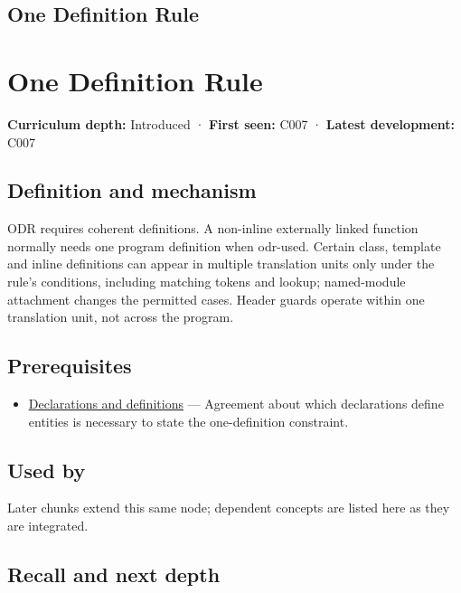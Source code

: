 \hypertarget{appendix-49d27bc9d9a5}{}
\section*{One Definition Rule}
\chapter{One Definition Rule}\label{appendix-49d27bc9d9a5-one-definition-rule}

\textbf{Curriculum depth:} Introduced · \textbf{First seen:} C007 · \textbf{Latest development:} C007

\section{Definition and mechanism}\label{appendix-49d27bc9d9a5-definition-and-mechanism}

ODR requires coherent definitions. A non-inline externally linked function normally needs one program definition when odr-used. Certain class, template and inline definitions can appear in multiple translation units only under the rule's conditions, including matching tokens and lookup; named-module attachment changes the permitted cases. Header guards operate within one translation unit, not across the program.

\section{Prerequisites}\label{appendix-49d27bc9d9a5-prerequisites}

\begin{itemize}
\tightlist
\item
  \hyperref[appendix-2e4d494c2d94]{Declarations and definitions} --- Agreement about which declarations define entities is necessary to state the one-definition constraint.
\end{itemize}

\section{Used by}\label{appendix-49d27bc9d9a5-used-by}

Later chunks extend this same node; dependent concepts are listed here as they are integrated.

\section{Recall and next depth}\label{appendix-49d27bc9d9a5-recall-and-next-depth}

